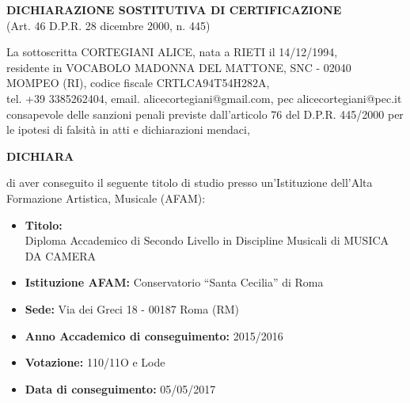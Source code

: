 \documentclass[a4paper,11pt]{article}
\begin{document}
\begin{center}
{\Large\textbf{DICHIARAZIONE SOSTITUTIVA DI CERTIFICAZIONE}}\\
{\large (Art. 46 D.P.R. 28 dicembre 2000, n. 445)}
\end{center}

\vspace{1cm}

\noindent La sottoscritta CORTEGIANI ALICE, nata a RIETI il 14/12/1994,\\
residente in VOCABOLO MADONNA DEL MATTONE, SNC - 02040 MOMPEO (RI), codice fiscale CRTLCA94T54H282A,\\
tel. +39 3385262404, email. alicecortegiani@gmail.com, pec alicecortegiani@pec.it\\
consapevole delle sanzioni penali previste dall'articolo 76 del D.P.R. 445/2000 per le ipotesi di falsità in atti e dichiarazioni mendaci,

\vspace{0.5cm}

\begin{center}
{\large\textbf{DICHIARA}}
\end{center}

\vspace{0.5cm}

\noindent di aver conseguito il seguente titolo di studio presso un'Istituzione dell'Alta Formazione Artistica, Musicale (AFAM):

\vspace{0.5cm}

\begin{itemize}
\item\textbf{Titolo:} \\
Diploma Accademico di Secondo Livello in Discipline Musicali di MUSICA DA CAMERA
\vspace{0.3cm}
\item\textbf{Istituzione AFAM:} Conservatorio ``Santa Cecilia'' di Roma
\vspace{0.3cm}
\item\textbf{Sede:} Via dei Greci 18 - 00187 Roma (RM)
\vspace{0.3cm}
\item\textbf{Anno Accademico di conseguimento:} 2015/2016
\vspace{0.3cm}
\item\textbf{Votazione:} 110/11O e Lode
\vspace{0.3cm}
\item\textbf{Data di conseguimento:} 05/05/2017
\end{itemize}
\end{document}
